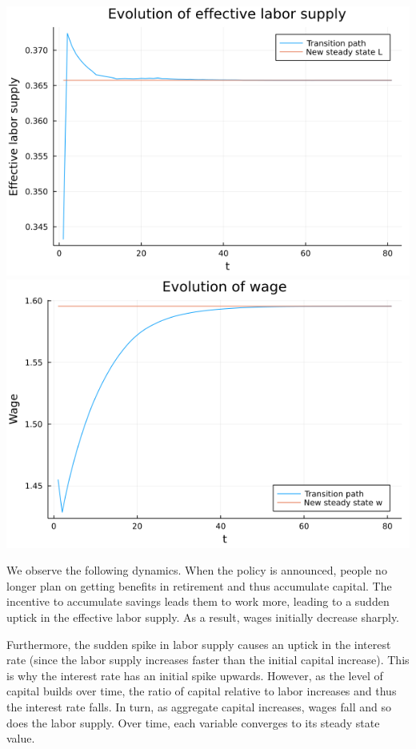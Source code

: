 \documentclass[12pt]{article}
\begin{document}
\begin{center}
\includegraphics[scale= 0.35]{lplot.png}\includegraphics[scale= 0.35]{wplot.png}
\end{center}
We observe the following dynamics. When the policy is announced, people no longer plan on getting benefits in retirement and thus accumulate capital. The incentive to accumulate savings leads them to work more, leading to a sudden uptick in the effective labor supply. As a result, wages initially decrease sharply. 

Furthermore, the sudden spike in labor supply causes an uptick in the interest rate (since the labor supply increases faster than the initial capital increase). This is why the interest rate has an initial spike upwards. However, as the level of capital builds over time, the ratio of capital relative to labor increases and thus the interest rate falls. In turn, as aggregate capital increases, wages fall and so does the labor supply. Over time, each variable converges to its steady state value.
\end{document}
